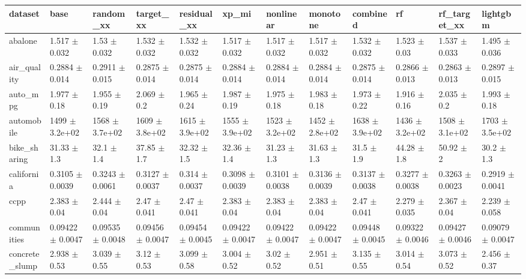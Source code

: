 \begin{tabular}{llllllllllll}
\toprule
dataset & base & random\_xx & target\_xx & residual\_xx & xp\_mi & nonlinear & monotone & combined & rf & rf\_target\_xx & lightgbm \\
\midrule
abalone & 1.517 $\pm$ 0.032 & 1.53 $\pm$ 0.032 & 1.532 $\pm$ 0.032 & 1.532 $\pm$ 0.032 & 1.517 $\pm$ 0.032 & 1.517 $\pm$ 0.032 & 1.517 $\pm$ 0.032 & 1.532 $\pm$ 0.032 & 1.523 $\pm$ 0.03 & 1.537 $\pm$ 0.033 & 1.495 $\pm$ 0.036 \\
air\_quality & 0.2884 $\pm$ 0.014 & 0.2911 $\pm$ 0.015 & 0.2875 $\pm$ 0.014 & 0.2875 $\pm$ 0.014 & 0.2884 $\pm$ 0.014 & 0.2884 $\pm$ 0.014 & 0.2884 $\pm$ 0.014 & 0.2875 $\pm$ 0.014 & 0.2866 $\pm$ 0.013 & 0.2863 $\pm$ 0.013 & 0.2897 $\pm$ 0.015 \\
auto\_mpg & 1.977 $\pm$ 0.18 & 1.955 $\pm$ 0.19 & 2.069 $\pm$ 0.2 & 1.965 $\pm$ 0.24 & 1.987 $\pm$ 0.19 & 1.975 $\pm$ 0.18 & 1.983 $\pm$ 0.18 & 1.973 $\pm$ 0.22 & 1.916 $\pm$ 0.16 & 2.035 $\pm$ 0.2 & 1.993 $\pm$ 0.18 \\
automobile & 1499 $\pm$ 3.2e+02 & 1568 $\pm$ 3.7e+02 & 1609 $\pm$ 3.8e+02 & 1615 $\pm$ 3.9e+02 & 1555 $\pm$ 3.9e+02 & 1523 $\pm$ 3.2e+02 & 1452 $\pm$ 2.8e+02 & 1638 $\pm$ 3.9e+02 & 1436 $\pm$ 3.2e+02 & 1508 $\pm$ 3.1e+02 & 1703 $\pm$ 3.5e+02 \\
bike\_sharing & 31.33 $\pm$ 1.3 & 32.1 $\pm$ 1.4 & 37.85 $\pm$ 1.7 & 32.32 $\pm$ 1.5 & 32.36 $\pm$ 1.4 & 31.23 $\pm$ 1.3 & 31.63 $\pm$ 1.3 & 31.5 $\pm$ 1.9 & 44.28 $\pm$ 1.8 & 50.92 $\pm$ 2 & 30.2 $\pm$ 1.3 \\
california & 0.3105 $\pm$ 0.0039 & 0.3243 $\pm$ 0.0061 & 0.3127 $\pm$ 0.0037 & 0.314 $\pm$ 0.0037 & 0.3098 $\pm$ 0.0039 & 0.3101 $\pm$ 0.0038 & 0.3136 $\pm$ 0.0039 & 0.3137 $\pm$ 0.0038 & 0.3277 $\pm$ 0.0038 & 0.3263 $\pm$ 0.0023 & 0.2919 $\pm$ 0.0041 \\
ccpp & 2.383 $\pm$ 0.04 & 2.444 $\pm$ 0.04 & 2.47 $\pm$ 0.041 & 2.47 $\pm$ 0.041 & 2.383 $\pm$ 0.04 & 2.383 $\pm$ 0.04 & 2.383 $\pm$ 0.04 & 2.47 $\pm$ 0.041 & 2.279 $\pm$ 0.035 & 2.367 $\pm$ 0.04 & 2.239 $\pm$ 0.058 \\
communities & 0.09422 $\pm$ 0.0047 & 0.09535 $\pm$ 0.0048 & 0.09456 $\pm$ 0.0047 & 0.09454 $\pm$ 0.0045 & 0.09422 $\pm$ 0.0047 & 0.09422 $\pm$ 0.0047 & 0.09422 $\pm$ 0.0047 & 0.09448 $\pm$ 0.0045 & 0.09322 $\pm$ 0.0046 & 0.09427 $\pm$ 0.0046 & 0.09079 $\pm$ 0.0047 \\
concrete\_slump & 2.938 $\pm$ 0.53 & 3.039 $\pm$ 0.55 & 3.12 $\pm$ 0.53 & 3.099 $\pm$ 0.58 & 3.004 $\pm$ 0.52 & 3.02 $\pm$ 0.52 & 2.951 $\pm$ 0.51 & 3.135 $\pm$ 0.55 & 3.014 $\pm$ 0.54 & 3.073 $\pm$ 0.52 & 2.456 $\pm$ 0.37 \\

\end{tabular}
